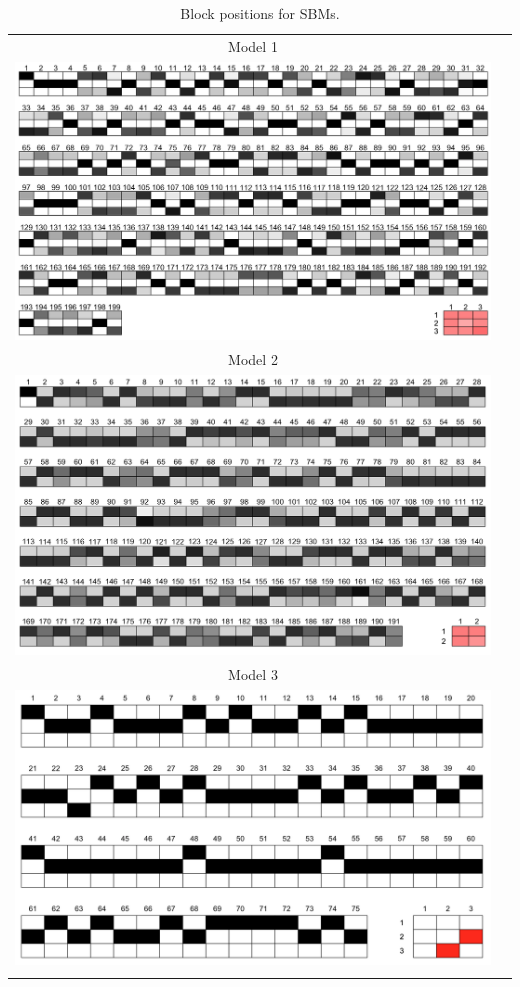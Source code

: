 \documentclass[fleqn,12pt]{wlscirep}
\begin{document}
\clearpage
\begin{longtable}[!h]{c@{\hskip 0cm}c}
Model 1 \\
\includegraphics[height=.29\textheight, clip=true, trim=0cm 0cm 0cm 0cm]{figures/SBM_m1}   \\
Model 2 \\
\includegraphics[height=.29\textheight, clip=true, trim=0cm 0cm 0cm 0cm]{figures/SBM_m2}   \\
Model 3 \\
\includegraphics[height=.25\textheight, clip=true, trim=0cm 0cm 0cm 0cm]{figures/SBM_m3}   \\
\caption{\label{fig:SBM_plot_1} Block positions for SBMs.}
\end{longtable}





\clearpage



\end{document}

